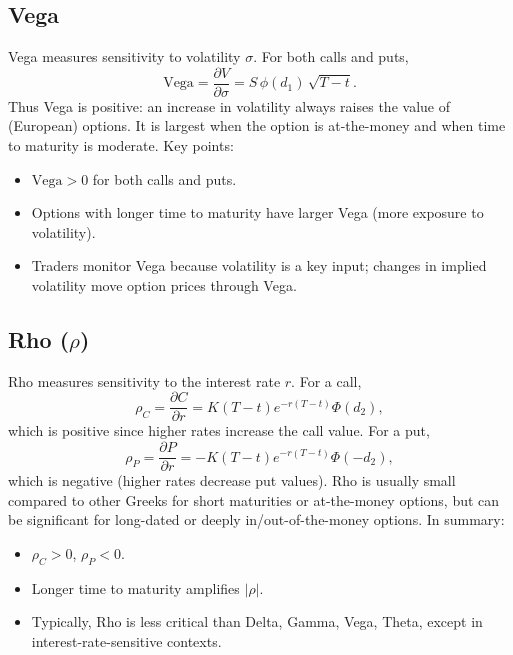 \subsection*{Vega}
Vega measures sensitivity to volatility \(\sigma\).  For both calls and puts,
\[
\mathrm{Vega} = \frac{\partial V}{\partial \sigma} = S\,\phi(d_1)\,\sqrt{T-t}.
\]
Thus Vega is positive: an increase in volatility always raises the value of (European) options.  It is largest when the option is at-the-money and when time to maturity is moderate.  Key points:
\begin{itemize}
    \item \(\mathrm{Vega} > 0\) for both calls and puts.
    \item Options with longer time to maturity have larger Vega (more exposure to volatility).
    \item Traders monitor Vega because volatility is a key input; changes in implied volatility move option prices through Vega.
\end{itemize}

\subsection*{Rho (\(\rho\))}
Rho measures sensitivity to the interest rate \(r\).  For a call,
\[
\rho_C = \frac{\partial C}{\partial r} = K(T-t)e^{-r(T-t)}\Phi(d_2),
\]
which is positive since higher rates increase the call value.  For a put,
\[
\rho_P = \frac{\partial P}{\partial r} = -K(T-t)e^{-r(T-t)}\Phi(-d_2),
\]
which is negative (higher rates decrease put values).  Rho is usually small compared to other Greeks for short maturities or at-the-money options, but can be significant for long-dated or deeply in/out-of-the-money options.  In summary:
\begin{itemize}
    \item \(\rho_C > 0\), \(\rho_P < 0\).
    \item Longer time to maturity amplifies \(|\rho|\).
    \item Typically, Rho is less critical than Delta, Gamma, Vega, Theta, except in interest-rate-sensitive contexts.
\end{itemize}

